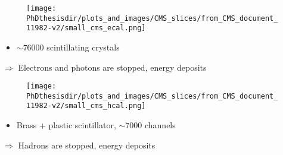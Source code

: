 \begin{frame}
\addtocounter{framenumber}{-1}
\begin{minipage}[t]{.6\textwidth}
\begin{figure}
\texttt{[image: \\PhDthesisdir/plots\_and\_images/CMS\_slices/from\_CMS\_document\_11982-v2/small\_cms\_ecal.png]}
\end{figure}
\end{minipage}
\hfill\begin{minipage}[t]{.35\textwidth}
\begin{block}{}
\begin{itemize}
\item $\sim\num{76000}$ scintillating  crystals
\end{itemize}
\end{block}

\begin{block}{}
$\Rightarrow$ Electrons and photons are stopped, energy deposits
\end{block}
\end{minipage}

\end{frame}

\begin{frame}
\addtocounter{framenumber}{-1}
\begin{minipage}[t]{.6\textwidth}
\begin{figure}
\texttt{[image: \\PhDthesisdir/plots\_and\_images/CMS\_slices/from\_CMS\_document\_11982-v2/small\_cms\_hcal.png]}
\end{figure}
\end{minipage}
\hfill\begin{minipage}[t]{.35\textwidth}
\begin{block}{}
\begin{itemize}
\item Brass + plastic scintillator, $\sim\num{7000}$ channels
\end{itemize}
\end{block}

\begin{block}{}
$\Rightarrow$ Hadrons are stopped, energy deposits
\end{block}
\end{minipage}

\end{frame}

